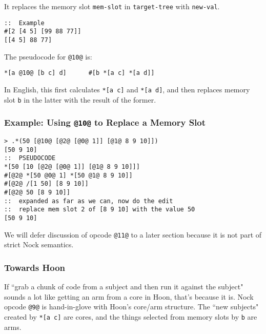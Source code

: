 \documentclass[twoside]{article}
\begin{document}
\noindent{}
It replaces the memory slot \lstinline[style=inlinecode]{mem-slot} in \lstinline[style=inlinecode]{target-tree} with \lstinline[style=inlinecode]{new-val}.

\begin{lstlisting}[style=listingcode]
::  Example
#[2 [4 5] [99 88 77]]
[[4 5] 88 77]
\end{lstlisting}

\noindent{}
The pseudocode for \lstinline[style=inlinecode]{@10@} is:

\begin{lstlisting}[style=listingcode]
*[a @10@ [b c] d]      #[b *[a c] *[a d]]
\end{lstlisting}

In English, this first calculates \lstinline[style=inlinecode]{*[a c]} and \lstinline[style=inlinecode]{*[a d]}, and then replaces memory slot \lstinline[style=inlinecode]{b} in the latter with the result of the former.

\subsubsection{Example: Using \lstinline[style=inlinecode]{@10@} to Replace a Memory Slot}

\begin{lstlisting}[style=listingcode]
> .*(50 [@10@ [@2@ [@0@ 1]] [@1@ 8 9 10]])
[50 9 10]
::  PSEUDOCODE
*[50 [10 [@2@ [@0@ 1]] [@1@ 8 9 10]]]
#[@2@ *[50 @0@ 1] *[50 @1@ 8 9 10]]
#[@2@ /[1 50] [8 9 10]]
#[@2@ 50 [8 9 10]]
::  expanded as far as we can, now do the edit
::  replace mem slot 2 of [8 9 10] with the value 50
[50 9 10]
\end{lstlisting}

We will defer discussion of opcode \lstinline[style=inlinecode]{@11@} to a later section because it is not part of strict Nock semantics.

\subsubsection{Towards Hoon}

If ``grab a chunk of code from a subject and then run it against the subject" sounds a lot like getting an arm from a core in Hoon, that's because it is.  Nock opcode \lstinline[style=inlinecode]{@9@} is hand-in-glove with Hoon's core/arm structure.  The ``new subjects" created by \lstinline[style=inlinecode]{*[a c]} are cores, and the things selected from memory slots by \lstinline[style=inlinecode]{b} are arms.
\end{document}
